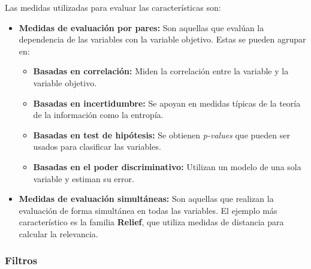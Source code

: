 \documentclass[12pt, letterpaper]{article}
\begin{document}
Las medidas utilizadas para evaluar las características son:
\begin{itemize}
    \item \textbf{Medidas de evaluación por pares:} Son aquellas que evalúan la dependencia de las variables con la variable objetivo. Estas se pueden agrupar en:
    \begin{itemize}
        \item \textbf{Basadas en correlación:} Miden la correlación entre la variable y la variable objetivo.
        \item \textbf{Basadas en incertidumbre:} Se apoyan en medidas típicas de la teoría de la información como la entropía.
        \item \textbf{Basadas en test de hipótesis:} Se obtienen \textit{p-values} que pueden ser usados para clasificar las variables.
        \item \textbf{Basadas en el poder discriminativo:} Utilizan un modelo de una sola variable y estiman su error.
    \end{itemize}
    \item \textbf{Medidas de evaluación simultáneas:} Son aquellas que realizan la evaluación de forma simultánea en todas las variables. El ejemplo más característico es la familia \textbf{Relief}, que utiliza medidas de distancia para calcular la relevancia.
\end{itemize}

\subsubsection{Filtros}
\end{document}
